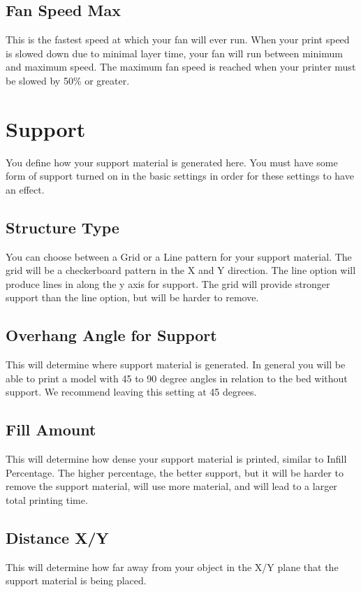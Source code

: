 \subsection{Fan Speed Max}
This is the fastest speed at which your fan will ever run. When your print speed is slowed down due to minimal layer time, your fan will run between minimum and maximum speed. The maximum fan speed is reached when your printer must be slowed by 50\% or greater.

\section{Support}
You define how your support material is generated here. You must have some form of support turned on in the basic settings in order for these settings to have an effect.

\subsection{Structure Type}
You can choose between a Grid or a Line pattern for your support material. The grid will be a checkerboard pattern in the X and Y direction. The line option will produce lines in along the y axis for support. The grid will provide stronger support than the line option, but will be harder to remove.

\subsection{Overhang Angle for Support}
This will determine where support material is generated. In general you will be able to print a model with 45 to 90 degree angles in relation to the bed without support. We recommend leaving this setting at 45 degrees.

\subsection{Fill Amount}
This will determine how dense your support material is printed, similar to Infill Percentage. The higher percentage, the better support, but it will be harder to remove the support material, will use more material, and will lead to a larger total printing time.

\subsection{Distance X/Y}
This will determine how far away from your object in the X/Y plane that the support material is being placed.

